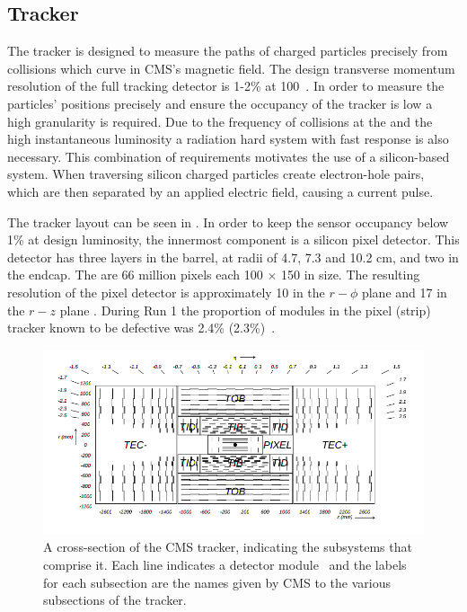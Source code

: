 \subsection{Tracker}
\label{sec:tracker}
The tracker is designed to measure the paths of charged particles precisely from \LHC collisions which curve in CMS's magnetic field. The design transverse momentum resolution of the full tracking detector is 1-2\% at 100\GeV~. In order to measure the particles' positions precisely and ensure the occupancy of the tracker is low a high granularity is required. Due to the frequency of collisions at the \LHC and the high instantaneous luminosity a radiation hard system with fast response is also necessary. This combination of requirements motivates the use of a silicon-based system. When traversing silicon charged particles create electron-hole pairs, which are then separated by an applied electric field, causing a current pulse.

The tracker layout can be seen in . In order to keep the sensor occupancy below 1\% at design luminosity, the innermost component is a silicon pixel detector. This detector has three layers in the barrel, at radii of 4.7, 7.3 and 10.2 cm, and two in the endcap. The are 66 million pixels each 100\,\micron\,$\times$ 150\,\micron\,in size. The resulting resolution of the pixel detector is approximately 10\,\micron\,in the $r-\phi$ plane and 17\,\micron\,in the $r-z$ plane \cite{trackerperformance}. During Run 1 the proportion of modules in the pixel (strip) tracker known to be defective was 2.4\% (2.3\%)~\cite{Chatrchyan:1704291}.

\begin{figure}
  \includegraphics[width=1.2\largefigwidth]{plots/detector/TrackerSchematic.png}
  \caption[A cross-section of the CMS tracker, indicating the subsystems that comprise it. Each line indicates a detector module and the labels for each subsection are the names given by CMS to the various subsections of the tracker.]{A cross-section of the CMS tracker, indicating the subsystems that comprise it. Each line indicates a detector module~\cite{Chatrchyan:2008aa} and the labels for each subsection are the names given by CMS to the various subsections of the tracker.}
  \label{fig:trackerschematic}
\end{figure}




